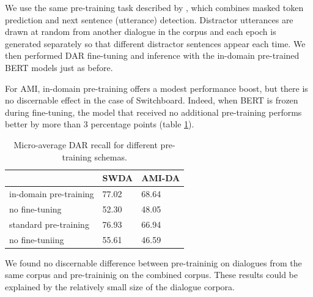 \documentclass[11pt,a4paper]{article}
\begin{document}
We use the same pre-training task described by \citet{devlinBERTPretrainingDeep2018}, which combines masked token prediction and next sentence (utterance) detection. 
Distractor utterances are drawn at random from another dialogue in the corpus
and each epoch is generated separately so that different distractor sentences appear each time.
We then performed DAR fine-tuning and inference with the in-domain pre-trained BERT models just as before.

For AMI, in-domain pre-training offers a modest performance boost, but there is no discernable effect in the case of Switchboard.
Indeed, when BERT is frozen during fine-tuning, the model that received no additional pre-training performs better by more than 3 percentage points (table \ref{tab:exp3-recall}).

\begin{table}[]
\begin{tabular}{@{}lll@{}}
\toprule
                       & SWDA  & AMI-DA \\ \midrule
in-domain pre-training & 77.02 & 68.64  \\
no fine-tuning         & 52.30 & 48.05  \\ \midrule
standard pre-training  & 76.93 & 66.94  \\
no fine-tuniing        & 55.61 & 46.59  \\ \bottomrule
\end{tabular}
  \caption{Micro-average DAR recall for different pre-training schemas.}
  \label{tab:exp3-recall}
\end{table}

We found no discernable difference between pre-traininig on dialogues from the same corpus and pre-traininig on the combined corpus.
These results could be explained by the relatively small size of the dialogue corpora.

\end{document}
